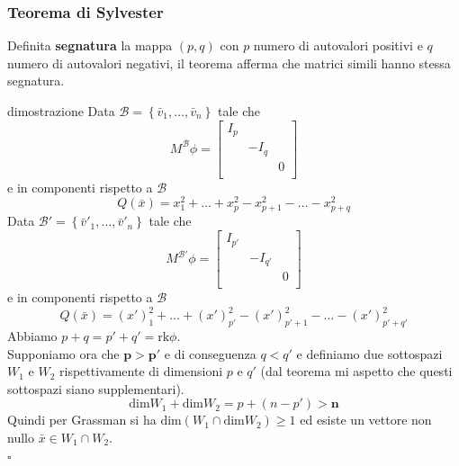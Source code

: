 \documentclass[x11names]{article}
\newcommand*{\QEDB}{\null\nobreak\hfill\ensuremath{\square}}%
\begin{document}
\begin{center}
	\colorbox{myred}{\begin{minipage}{5.75in}
			\begin{redes}{}
				\subsubsection{Teorema di Sylvester}
				Definita \textbf{segnatura} la mappa $(p,q)$ con $p$ numero di autovalori positivi e $q$ numero di autovalori negativi, il teorema afferma che matrici simili hanno stessa segnatura. 
			\end{redes}
	\end{minipage}}        
\end{center}
\begin{es}{dimostrazione}
	Data $\mathcal{B} = \left\{\bar{v}_{1},\dots,\bar{v}_{n}\right\}$ tale che 
	\[
	M^{\mathcal{B}}\phi = 
	\left[\begin{array}{ccc}
		I_{p} & & \\
		 & -I_{q} & \\
		  & & 0\\
	\end{array}\right]
	\]
	e in componenti rispetto a $\mathcal{B}$
	\[
	Q(\bar{x}) = x_{1}^2 + \dots + x_{p}^2 - x_{p+1}^2 - \dots - x_{p+q}^2 
	\]
	Data $\mathcal{B}' = \left\{\bar{v}'_{1},\dots,\bar{v}'_{n}\right\}$ tale che 
	\[
	M^{\mathcal{B}'}\phi = 
	\left[\begin{array}{ccc}
		I_{p'} & & \\
		& -I_{q'} & \\
		& & 0\\
	\end{array}\right]
	\]
	e in componenti rispetto a $\mathcal{B}$
	\[
	Q(\bar{x}) = (x')_{1}^2 + \dots + (x')_{p'}^2 - (x')_{p'+1}^2 - \dots - (x')_{p'+q'}^2 
	\]
	Abbiamo $p + q = p' + q' = \text{rk}\phi$. \\
	
	Supponiamo ora che $\mathbf{p > p'}$ e di conseguenza $q < q'$ e definiamo due sottospazi $W_{1}$ e $W_{2}$ rispettivamente di dimensioni $p$ e $q'$ (dal teorema mi aspetto che questi sottospazi siano supplementari). \\
	\[
	\text{dim}W_{1} + \text{dim}W_{2} = p + (n-p') \mathbf{> n}
	\]
	Quindi per Grassman si ha $\text{dim}(W_{1} \cap \text{dim}W_{2}) \geq 1$ ed esiste un vettore non nullo $\bar{x} \in W_{1} \cap W_{2}$.
	\\
	\QEDB
\end{es}
\end{document}
